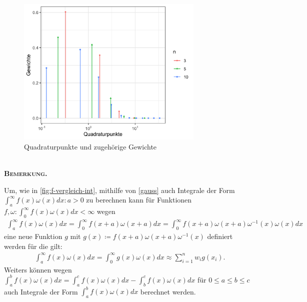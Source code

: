 \documentclass[12pt,a4paper]{scrartcl}
\numberwithin{equation}{section}
\numberwithin{myalgctr}{section}
\numberwithin{mytheoremctr}{subsection}
\numberwithin{mykorollarctr}{subsection}
\numberwithin{mylemmactr}{subsection}
\numberwithin{mybeispielctr}{subsection}
\newenvironment{bemerkung}{%
	\bigskip\noindent%
	\textsc{\textbf{\\Bemerkung.}}%
	\indent
}{\par\bigskip}  %
\begin{document}
	\begin{figure}[H]
		\begin{center}
			\includegraphics[width=0.8\textwidth]{../plots/quadraturpunkte-n-zusammen.png}
		\end{center}
		\caption{Quadraturpunkte und zugeh\"orige Gewichte}
		\label{fig:quadraturpunkte}
	\end{figure}

	\begin{bemerkung}
		Um, wie in \cref{fig:f-vergleich-int}, mithilfe von \cref{gauss} auch Integrale der Form $\int_{a}^{\infty}f(x)\omega(x)dx:a>0$ zu berechnen kann f\"ur Funktionen $f,\omega:\int_{0}^{\infty}f(x)\omega(x)dx<\infty$ wegen \autocite[vgl.][278]{ana2}
		\begin{align*}
		\int_{a}^{\infty}f(x)\omega(x)dx = \int_{0}^{\infty}f(x+a)\omega(x+a)dx = \int_{0}^{\infty}f(x+a)\omega(x+a)\omega^{-1}(x)\omega(x)dx
		\end{align*}
		eine neue Funktion $g$ mit $g(x) \coloneqq f(x+a)\omega(x+a)\omega^{-1}(x)$ definiert werden f\"ur die gilt:
		\begin{align*}
		\int_{a}^{\infty}f(x)\omega(x)dx = \int_{0}^{\infty}g(x)\omega(x)dx \approx  \sum_{i=1}^{n}w_ig(x_i).
		\end{align*}
		Weiters k\"onnen wegen $\int_{a}^{b}f(x)\omega(x)dx = \int_{a}^{c}f(x)\omega(x)dx - \int_{b}^{c}f(x)\omega(x)dx$ f\"ur $0\leq a\leq b\leq c$ auch Integrale der Form $\int_{a}^{b}f(x)\omega(x)dx$ berechnet werden.
	\end{bemerkung}
	
	\newpage
\end{document}
